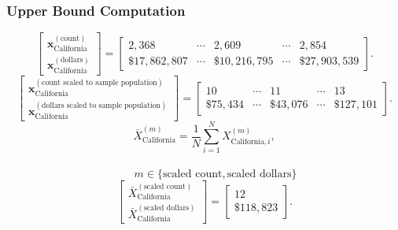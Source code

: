 \subsubsection{Upper Bound Computation}
\[
\begin{bmatrix}
\mathbf{x}_{\text{California}}^{(\text{count})}\\
\mathbf{x}_{\text{California}}^{(\text{dollars})}
\end{bmatrix}
=
\begin{bmatrix}
2{,}368 & \cdots & 2{,}609 & \cdots & 2{,}854\\
\$17{,}862{,}807 & \cdots & \$10{,}216{,}795 & \cdots & \$27{,}903{,}539
\end{bmatrix}.
\]
\[
\begin{bmatrix}
\mathbf{x}_{\text{California}}^{(\text{count scaled to sample population})}\\
\mathbf{x}_{\text{California}}^{(\text{dollars scaled to sample population})}
\end{bmatrix}
=
\begin{bmatrix}
10 & \cdots & 11 & \cdots & 13\\
\$75{,}434 & \cdots & \$43{,}076 & \cdots & \$127{,}101
\end{bmatrix}.
\]
\[
\bar{X}_{\text{California}}^{(m)}
= \frac{1}{N}\sum_{i=1}^{N} X_{\text{California},i}^{(m)},
\]
\\
\[
\qquad
m \in \{\text{scaled count},\text{scaled dollars}\}
\]
\[
\begin{bmatrix}
\bar{X}_{\text{California}}^{(\text{scaled count})}\\
\bar{X}_{\text{California}}^{(\text{scaled dollars})}
\end{bmatrix}
=
\begin{bmatrix}
12\\
\$118{,}823
\end{bmatrix}.
\]
